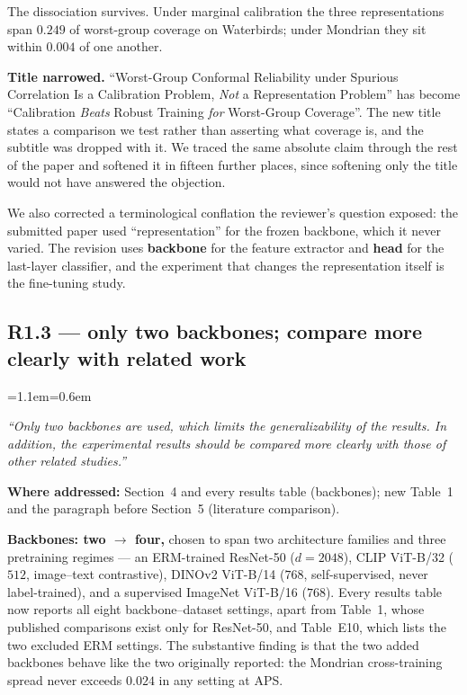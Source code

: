 \documentclass[11pt,a4paper]{article}
\newenvironment{reviewer}
  {\begin{list}{}{\leftmargin=1.1em\rightmargin=0.6em}\item[]\itshape\color{revgrey}\small}
  {\end{list}}
\newcommand{\where}[1]{{\textbf{Where addressed:} #1\par}}
\newcommand{\rpoint}[2]{\subsection*{#1 --- #2}}
\begin{document}
The dissociation survives. Under marginal calibration the three representations span $0.249$ of
worst-group coverage on Waterbirds; under Mondrian they sit within $0.004$ of one another.

\textbf{Title narrowed.} ``Worst-Group Conformal Reliability under Spurious Correlation Is
a Calibration Problem, \emph{Not} a Representation Problem'' has become ``Calibration
\emph{Beats} Robust Training \emph{for} Worst-Group Coverage''. The new title states a comparison
we test rather than asserting what coverage is, and the subtitle was dropped with it. We traced the
same absolute claim through the rest of the paper and softened it in fifteen further places, since
softening only the title would not have answered the objection.

We also corrected a terminological conflation the reviewer's question exposed: the submitted paper
used ``representation'' for the frozen backbone, which it never varied. The revision uses
\textbf{backbone} for the feature extractor and \textbf{head} for the last-layer classifier, and the
experiment that changes the representation itself is the fine-tuning study.

\rpoint{R1.3}{only two backbones; compare more clearly with related work}

\begin{reviewer}
``Only two backbones are used, which limits the generalizability of the results. In addition, the
experimental results should be compared more clearly with those of other related studies.''
\end{reviewer}

\where{Section~4 and every results table (backbones); new Table~1 and the paragraph before
Section~5 (literature comparison).}

\textbf{Backbones: two $\rightarrow$ four,} chosen to span two architecture families and three
pretraining regimes --- an ERM-trained ResNet-50 ($d=2048$), CLIP ViT-B/32 ($512$, image--text
contrastive), DINOv2 ViT-B/14 ($768$, self-supervised, never label-trained), and a supervised
ImageNet ViT-B/16 ($768$). Every results table now reports all eight backbone--dataset settings,
apart from Table~1, whose published comparisons exist only for ResNet-50, and Table~E10, which
lists the two excluded ERM settings. The
substantive finding is that the two added backbones behave like the two originally reported: the
Mondrian cross-training spread never exceeds $0.024$ in any setting at APS.
\end{document}

